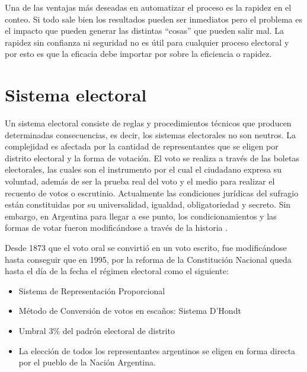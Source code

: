Una de las ventajas más deseadas en automatizar el proceso es la rapidez en el conteo. Si todo sale bien los resultados pueden ser inmediatos pero el problema es el impacto que pueden generar las distintas ``cosas'' que pueden salir mal. La rapidez sin confianza ni seguridad no es útil para cualquier proceso electoral y por esto es que la eficacia debe importar por sobre la eficiencia o rapidez.

\section{Sistema electoral}

Un sistema electoral consiste de reglas y procedimientos técnicos que producen determinadas consecuencias, es decir, los sistemas electorales no son neutros. 
La complejidad es afectada por la cantidad de representantes que se eligen por distrito electoral y la forma de votación. El voto se realiza a través de las boletas electorales, las cuales son el instrumento por el cual el ciudadano expresa su voluntad, además de ser la prueba real del voto y el medio para realizar el recuento de votos o escrutinio.
Actualmente las condiciones jurídicas del sufragio están constituidas por su universalidad, igualdad, obligatoriedad y secreto. Sin embargo, en Argentina para llegar a ese punto, los condicionamientos y las formas de votar fueron modificándose a través de la historia \cite{historia}.\newline

Desde 1873 que el voto oral se convirtió en un voto escrito, fue modificándose hasta conseguir que en 1995, por la reforma de la Constitución Nacional queda hasta el día de la fecha el régimen electoral como el siguiente:
\begin{itemize}
    \item Sistema de Representación Proporcional
    \item Método de Conversión de votos en escaños: Sistema D'Hondt
    \item Umbral 3\% del padrón electoral de distrito
    \item La elección de todos los representantes argentinos se eligen en forma directa por el pueblo de la Nación Argentina.
\end{itemize}
\newline





